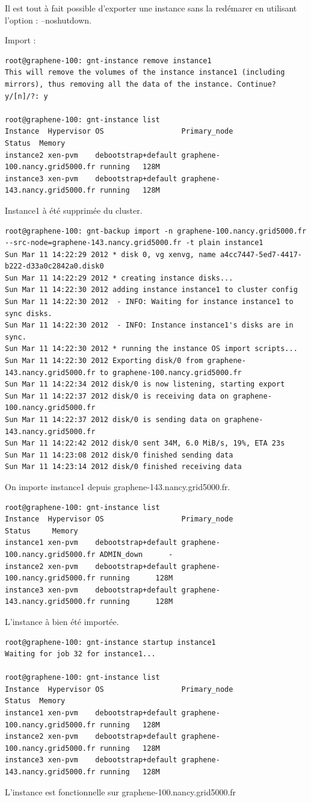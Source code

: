 Il est tout à fait possible d'exporter une instance sans la redémarer en utilisant l'option : --noshutdown.

Import :
\begin{lstlisting}
root@graphene-100: gnt-instance remove instance1
This will remove the volumes of the instance instance1 (including
mirrors), thus removing all the data of the instance. Continue?
y/[n]/?: y

root@graphene-100: gnt-instance list
Instance  Hypervisor OS                  Primary_node                   Status  Memory
instance2 xen-pvm    debootstrap+default graphene-100.nancy.grid5000.fr running   128M
instance3 xen-pvm    debootstrap+default graphene-143.nancy.grid5000.fr running   128M
\end{lstlisting}
Instance1 à été supprimée du cluster.
\begin{lstlisting}
root@graphene-100: gnt-backup import -n graphene-100.nancy.grid5000.fr --src-node=graphene-143.nancy.grid5000.fr -t plain instance1
Sun Mar 11 14:22:29 2012 * disk 0, vg xenvg, name a4cc7447-5ed7-4417-b222-d33a0c2842a0.disk0
Sun Mar 11 14:22:29 2012 * creating instance disks...
Sun Mar 11 14:22:30 2012 adding instance instance1 to cluster config
Sun Mar 11 14:22:30 2012  - INFO: Waiting for instance instance1 to sync disks.
Sun Mar 11 14:22:30 2012  - INFO: Instance instance1's disks are in sync.
Sun Mar 11 14:22:30 2012 * running the instance OS import scripts...
Sun Mar 11 14:22:30 2012 Exporting disk/0 from graphene-143.nancy.grid5000.fr to graphene-100.nancy.grid5000.fr
Sun Mar 11 14:22:34 2012 disk/0 is now listening, starting export
Sun Mar 11 14:22:37 2012 disk/0 is receiving data on graphene-100.nancy.grid5000.fr
Sun Mar 11 14:22:37 2012 disk/0 is sending data on graphene-143.nancy.grid5000.fr
Sun Mar 11 14:22:42 2012 disk/0 sent 34M, 6.0 MiB/s, 19%, ETA 23s
Sun Mar 11 14:23:08 2012 disk/0 finished sending data
Sun Mar 11 14:23:14 2012 disk/0 finished receiving data
\end{lstlisting}
On importe instance1 depuis graphene-143.nancy.grid5000.fr.
\begin{lstlisting}
root@graphene-100: gnt-instance list
Instance  Hypervisor OS                  Primary_node                   Status     Memory
instance1 xen-pvm    debootstrap+default graphene-100.nancy.grid5000.fr ADMIN_down      -
instance2 xen-pvm    debootstrap+default graphene-100.nancy.grid5000.fr running      128M
instance3 xen-pvm    debootstrap+default graphene-143.nancy.grid5000.fr running      128M
\end{lstlisting}
L'instance à bien été importée.
\begin{lstlisting}
root@graphene-100: gnt-instance startup instance1
Waiting for job 32 for instance1...

root@graphene-100: gnt-instance list
Instance  Hypervisor OS                  Primary_node                   Status  Memory
instance1 xen-pvm    debootstrap+default graphene-100.nancy.grid5000.fr running   128M
instance2 xen-pvm    debootstrap+default graphene-100.nancy.grid5000.fr running   128M
instance3 xen-pvm    debootstrap+default graphene-143.nancy.grid5000.fr running   128M
\end{lstlisting}
L'instance est fonctionnelle sur graphene-100.nancy.grid5000.fr

